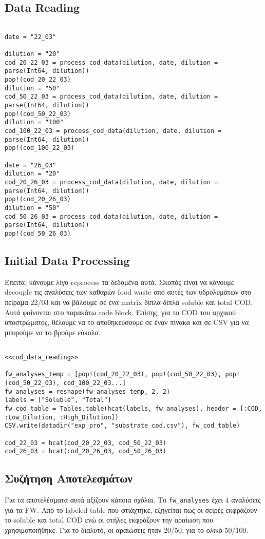 \documentclass[11pt]{article}
\begin{document}
\subsection{Data Reading}
\label{sec:org87faa9c}
\begin{verbatim}

date = "22_03"

dilution = "20"
cod_20_22_03 = process_cod_data(dilution, date, dilution = parse(Int64, dilution))
pop!(cod_20_22_03)
dilution = "50"
cod_50_22_03 = process_cod_data(dilution, date, dilution = parse(Int64, dilution))
pop!(cod_50_22_03)
dilution = "100"
cod_100_22_03 = process_cod_data(dilution, date, dilution = parse(Int64, dilution))
pop!(cod_100_22_03)

date = "26_03"
dilution = "20"
cod_20_26_03 = process_cod_data(dilution, date, dilution = parse(Int64, dilution))
pop!(cod_20_26_03)
dilution = "50"
cod_50_26_03 = process_cod_data(dilution, date, dilution = parse(Int64, dilution))
pop!(cod_50_26_03)
\end{verbatim}

\subsection{Initial Data Processing}
\label{sec:orge6c04a9}
Έπειτα, κάνουμε λίγο reprocess τα δεδομένα αυτά. Σκοπός είναι να κάνουμε decouple τις αναλύσεις των καθαρών food waste από αυτές των υδρολυμάτων στο πείραμα 22/03 και να βάλουμε σε ένα matrix δίπλα-δίπλα soluble και total COD. Αυτά φαίνονται στο παρακάτω code block. Επίσης, για το COD του αρχικού υποστρώματος, θέλουμε να το αποθηκεύσουμε σε έναν πίνακα και σε CSV για να μπορούμε να το βρούμε εύκολα.

\begin{verbatim}

<<cod_data_reading>>

fw_analyses_temp = [pop!(cod_20_22_03), pop!(cod_50_22_03), pop!(cod_50_22_03), cod_100_22_03...]
fw_analyses = reshape(fw_analyses_temp, 2, 2)
labels = ["Soluble", "Total"]
fw_cod_table = Tables.table(hcat(labels, fw_analyses), header = [:COD, :Low_Dilution, :High_Dilution])
CSV.write(datadir("exp_pro", "substrate_cod.csv"), fw_cod_table)

cod_22_03 = hcat(cod_20_22_03, cod_50_22_03)
cod_26_03 = hcat(cod_20_26_03, cod_50_26_03)
\end{verbatim}

\subsection{Συζήτηση Αποτελεσμάτων}
\label{sec:orgda705b2}
Για τα αποτελέσματα αυτά αξίζουν κάποια σχόλια. Το \texttt{fw\_analyses} έχει 4 αναλύσεις για τα FW. Από το labeled table που φτιάχτηκε, εξηγείται πως οι σειρές εκφράζουν το soluble και total COD ενώ οι στήλες εκφράζουν την αραίωση που χρησιμοποιήθηκε. Για το διαλυτό, οι αραιώσεις ήταν 20/50, για το ολικό 50/100.
\end{document}

